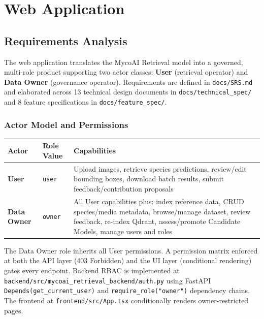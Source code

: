 \section{Web Application}\label{chapter-3-web-application}

\subsection{Requirements Analysis}\label{requirements-analysis}

The web application translates the MycoAI Retrieval model into a governed, multi-role product supporting two actor classes: \textbf{User} (retrieval operator) and \textbf{Data Owner} (governance operator). Requirements are defined in \texttt{docs/SRS.md} and elaborated across 13 technical design documents in \texttt{docs/technical\_spec/} and 8 feature specifications in \texttt{docs/feature\_spec/}.

\subsubsection{Actor Model and Permissions}\label{actor-model-and-permissions}

\begin{center}
\begin{tabular}{@{}p{3cm} p{4.5cm} p{6.5cm}@{}}
\toprule
\textbf{Actor} & \textbf{Role Value} & \textbf{Capabilities} \\
\midrule
\textbf{User} & \texttt{user} & Upload images, retrieve species predictions, review/edit bounding boxes, download batch results, submit feedback/contribution proposals \\
\textbf{Data Owner} & \texttt{owner} & All User capabilities plus: index reference data, CRUD species/media metadata, browse/manage dataset, review feedback, re-index Qdrant, assess/promote Candidate Models, manage users and roles \\
\bottomrule
\end{tabular}
\end{center}

The Data Owner role inherits all User permissions. A permission matrix enforced at both the API layer (403 Forbidden) and the UI layer (conditional rendering) gates every endpoint. Backend RBAC is implemented at \texttt{backend/src/mycoai\_retrieval\_backend/auth.py} using FastAPI \texttt{Depends(get\_current\_user)} and \texttt{require\_role("owner")} dependency chains. The frontend at \texttt{frontend/src/App.tsx} conditionally renders owner-restricted pages.

